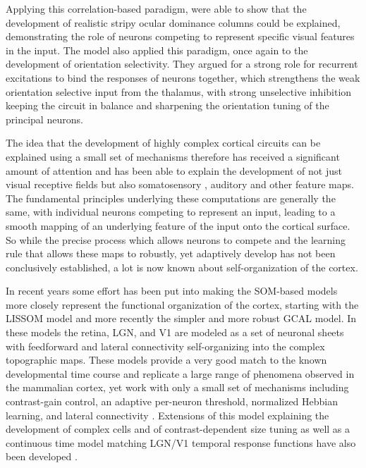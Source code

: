Applying this correlation-based paradigm, \cite{Miller1989} were able
to show that the development of realistic stripy ocular dominance
columns could be explained, demonstrating the role of neurons
competing to represent specific visual features in the input. The
\cite{Somers1995} model also applied this paradigm, once again to the
development of orientation selectivity.  They argued for a strong role
for recurrent excitations to bind the responses of neurons together,
which strengthens the weak orientation selective input from the
thalamus, with strong unselective inhibition keeping the circuit in
balance and sharpening the orientation tuning of the principal
neurons.

The idea that the development of highly complex cortical circuits can
be explained using a small set of mechanisms therefore has received a
significant amount of attention and has been able to explain the
development of not just visual receptive fields but also somatosensory
\citep{Wilson2010}, auditory \cite{Khan2011} and other feature
maps. The fundamental principles underlying these computations are
generally the same, with individual neurons competing to represent an
input, leading to a smooth mapping of an underlying feature of the
input onto the cortical surface. So while the precise process which
allows neurons to compete and the learning rule that allows these maps
to robustly, yet adaptively develop has not been conclusively
established, a lot is now known about self-organization of the cortex.

In recent years some effort has been put into making the SOM-based
models more closely represent the functional organization of the
cortex, starting with the LISSOM model \citep{Bednar2003} and more
recently the simpler and more robust GCAL \citep{Stevens2013}
model. In these models the retina, LGN, and V1 are modeled as a set of
neuronal sheets with feedforward and lateral connectivity
self-organizing into the complex topographic maps. These models
provide a very good match to the known developmental time course and
replicate a large range of phenomena observed in the mammalian cortex,
yet work with only a small set of mechanisms including contrast-gain
control, an adaptive per-neuron threshold, normalized Hebbian
learning, and lateral connectivity 
\citep{Stevens2013}. Extensions of this model explaining the
development of complex cells and of contrast-dependent size tuning
\citep{Antolik2011} as well as a continuous time model matching LGN/V1
temporal response functions have also been developed
\citep{Stevens2011}.

